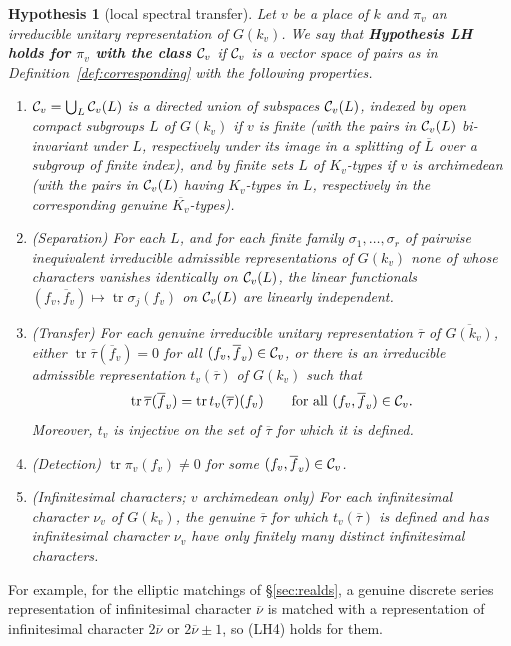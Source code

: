 \documentclass[12pt,letterpaper]{book}
\theoremstyle{plain}
\newtheorem{hypothesis}[theorem]{Hypothesis}
\theoremstyle{definition}
\theoremstyle{remark}
\theoremstyle{remark}
\newcommand{\tr}{\operatorname{tr}}
\begin{document}
\begin{hypothesis}[local spectral transfer]\label{hyp:LH}
Let $v$ be a place of $k$ and $\pi_v$ an irreducible unitary
representation of $G(k_v)$. We say that {\bf Hypothesis LH holds for
$\pi_v$ with the class ${\cal C}_v$} if ${\cal C}_v$ is a vector space of
pairs as in Definition~\ref{def:corresponding} with the following
properties.
\begin{enumerate}
\item[(LH0)] ${\cal C}_v=\bigcup_L{\cal C}_v(L)$ is a directed union of
subspaces ${\cal C}_v(L)$, indexed by open compact subgroups $L$ of
$G(k_v)$ if $v$ is finite (with the pairs in ${\cal C}_v(L)$ bi-invariant
under $L$, respectively under its image in a splitting of $\overline{L}$
over a subgroup of finite index), and by finite sets $L$ of
$K_v$-types if $v$ is archimedean (with the pairs in ${\cal C}_v(L)$
having $K_v$-types in $L$, respectively in the corresponding genuine
$\overline{K_v}$-types).
\item[(LH1)] (Separation) For each $L$, and for each finite family
$\sigma_1,\dots,\sigma_r$ of pairwise inequivalent irreducible
admissible representations of $G(k_v)$ none of whose characters vanishes
identically on ${\cal C}_v(L)$, the linear functionals
$(f_v,\overline{f}_v)\longmapsto\tr \sigma_j(f_v)$ on
${\cal C}_v(L)$ are linearly independent.
\item[(LH2)] (Transfer) For each genuine irreducible unitary
representation $\overline{\tau}$ of $\overline{G(k_v)}$, either
$\tr \overline{\tau}(\overline{f}_v)=0$ for all
$(f_v,\overline{f}_v)\in{\cal C}_v$, or there is an irreducible
admissible representation $t_v(\overline{\tau})$ of $G(k_v)$ such that
\[
\tr \overline{\tau}(\overline{f}_v)=\tr t_v(\overline{\tau})(f_v)
\qquad\text{for all }(f_v,\overline{f}_v)\in{\cal C}_v .
\]
Moreover, $t_v$ is injective on the set of $\overline{\tau}$ for which it
is defined.
\item[(LH3)] (Detection) $\tr \pi_v(f_v)\neq 0$ for some
$(f_v,\overline{f}_v)\in{\cal C}_v$.
\item[(LH4)] (Infinitesimal characters; $v$ archimedean only) For each
infinitesimal character $\nu_v$ of $G(k_v)$, the genuine $\overline\tau$
for which $t_v(\overline\tau)$ is defined and has infinitesimal character
$\nu_v$ have only finitely many distinct infinitesimal characters.
\end{enumerate}
\end{hypothesis}

For example, for the elliptic matchings of \S\ref{sec:realds}, a genuine
discrete series representation of infinitesimal character $\overline\nu$
is matched with a representation of infinitesimal character
$2\overline\nu$ or $2\overline\nu\pm1$, so (LH4) holds for them.
\end{document}
